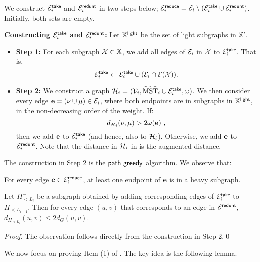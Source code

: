 We construct $\mathcal{E}_i^{\mathsf{take}}$ and $\mathcal{E}^{\mathsf{redunt}}_i$ in two steps below;  $\mathcal{E}_i^{\mathsf{reduce}} = \mathcal{E}_i \setminus (\mathcal{E}_i^{\mathsf{take}}\cup \mathcal{E}_i^{\mathsf{redunt}})$. Initially, both sets are empty.

\begin{tcolorbox}
	\hypertarget{EiPartition}{}
	\textbf{Constructing $\mathcal{E}_i^{\mathsf{take}}$ and $\mathcal{E}^{\mathsf{redunt}}_i$:} Let $\mathbb{X}^{\mathsf{light}}$ be the set of light subgraphs in $\mathbb{X}'$.
	\begin{itemize}
		\item \textbf{Step 1:} For each subgraph $\mathcal{X}\in \mathbb{X}$,  we add all edges of $\mathcal{E}_i$ in $\mathcal{X}$ to $\mathcal{E}_i^{\mathsf{take}}$. That is, $$\mathcal{E}_i^{\mathsf{take}} \leftarrow \mathcal{E}_i^{\mathsf{take}} \cup (\mathcal{E}_i\cap \mathcal{E}(\mathcal{X})).$$
		\item \textbf{Step 2:} We construct a graph $\mathcal{H}_i = (\mathcal{V}_i, \widetilde{\mathrm{MST}}_{i}\cup \mathcal{E}_i^{\mathsf{take}}, \omega)$. We then consider every edge $\mathbf{e} = (\nu\cup \mu) \in \mathcal{E}_i$, where both endpoints are in subgraphs in  $\mathbb{X}^{\mathsf{light}}$, in the non-decreasing order of the weight. If:
		\begin{equation}\label{eq:greedy-Hi}
			d_{\mathcal{H}_i }(\nu,\mu) > 2 \omega(\mathbf{e})~,
		\end{equation}
		then we add $\mathbf{e}$ to $\mathcal{E}_i^{\mathsf{take}}$ (and hence, also to $\mathcal{H}_i$). Otherwise, we add $\mathbf{e}$ to $\mathcal{E}_i^{\mathsf{redunt}}$. Note that the distance in $\mathcal{H}_i$ in  is the augmented distance. 
	\end{itemize}
\end{tcolorbox}


The construction in Step 2 is the $\mathsf{path~greedy}$ algorithm. We observe that:

\begin{observation}\label{obs:Ereduce} For every edge $\mathbf{e} \in \mathcal{E}^{\mathsf{reduce}}_i$, at least one endpoint of $\mathbf{e}$ is in a heavy subgraph.
\end{observation}



\begin{observation}\label{obs:Item2Clustering}  Let $H_{< L_i}^{-}$ be a subgraph obtained by adding corresponding edges of $\mathcal{E}_i^{\mathsf{take}}$ to $H_{< L_{i-1}}$.  Then for every edge $(u,v)$ that corresponds to an edge in $\mathcal{E}^{\mathsf{redunt}}$, $d_{H_{< L_i}^{-}}(u,v)\leq 2d_G(u,v)$. 
\end{observation}
\begin{proof}
	The observation follows directly from the construction in Step 2.\qed 
\end{proof}
We now focus on proving Item (1) of . The key idea is the following lemma.

